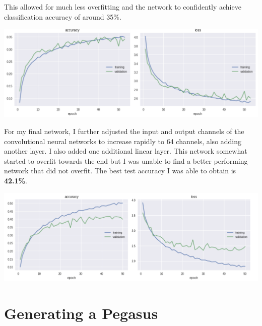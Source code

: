 \documentclass[11pt]{article}
\begin{document}
This allowed for much less overfitting and the network to confidently achieve classification accuracy of around 35\%.

     \begin{center} %
        \begin{minipage}{0.75\linewidth}
            \includegraphics[width=\linewidth]{accuracy7}
        \end{minipage}%
    \end{center}
    

For my final network, I further adjusted the input and output channels of the convolutional neural networks to increase rapidly to 64 channels, also adding another layer. I also added one additional linear layer.  This network somewhat started to overfit towards the end but I was unable to find a better performing network that did not overfit. The best test accuracy I was able to obtain is \textbf{42.1\%}.

     \begin{center} %
        \begin{minipage}{0.75\linewidth}
            \includegraphics[width=\linewidth]{accuracy9}
        \end{minipage}%
    \end{center}

\section{Generating a Pegasus}
\end{document}
